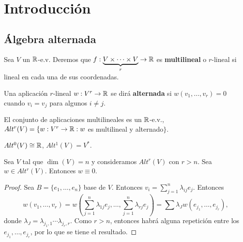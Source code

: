 \documentclass[CV.tex]{subfiles}
\begin{document}

\chapter{Introducción}
\section{Álgebra alternada}
\begin{defi}
Sea $V$ un $\mathbb{R}$-e.v. Deremos que $f:\underbrace{V\times\dots\times V}_{r}\to\mathbb{R}$ es \textbf{multilineal} o $r$-lineal si lineal en cada una de sus coordenadas.

Una aplicación $r$-lineal $w:V^r\to\mathbb{R}$ se dirá \textbf{alternada} si $w(v_1,\dots, v_r)=0$ cuando $v_i=v_j$ para algunos $i\neq j$. 
\end{defi}

El conjunto de aplicaciones multilineales es un $\mathbb{R}$-e.v., $Alt^r(V)=\{w:V^r\to\mathbb{R}: w$ es multilineal y alternado$\}$. 
\begin{ej}
$Alt^0(V)\cong\mathbb{R}$, $Alt^1(V)=V^*$.
\end{ej}

\begin{lemma}
Sea $V$ tal que $\dim(V)=n$ y consideramos $Alt^r(V)$ con $r>n$. Sea $w\in Alt^r(V)$. Entonces $w\equiv 0$.
\end{lemma}
\begin{proof}
Sea $B=\{e_1,\dots, e_n\}$ base de $V$. Entonces $v_i=\sum_{j=1}^n\lambda_{ij}e_j$. Entonces
$$
w(v_1,\dots, v_r)=w\left(\sum_{j=1}^n\lambda_{1j}e_j,\dots,\sum_{j=1}^n\lambda_{rj}e_j\right)=\sum\lambda_Jw(e_{j_1},\dots, e_{j_r}),$$
donde $\lambda_J=\lambda_{j_1,1}\cdots\lambda_{j_r,r}$. Como $r>n$, entonces habrá alguna repetición entre los $e_{j_1},\dots, e_{j_r}$, por lo que se tiene el resultado.
\end{proof}
\end{document}
